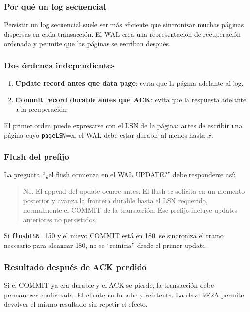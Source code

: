 \documentclass[variant=docente,cover=institutional,mode=screen]{ua-engineering-v6-article}
\begin{document}
\subsubsection*{Por qué un log secuencial}

Persistir un log secuencial suele ser más eficiente que sincronizar muchas páginas dispersas en cada transacción. El WAL crea una representación de recuperación ordenada y permite que las páginas se escriban después.

\subsubsection*{Dos órdenes independientes}

\begin{enumerate}
\item \textbf{Update record antes que data page}: evita que la página adelante al log.
\item \textbf{Commit record durable antes que ACK}: evita que la respuesta adelante a la recuperación.
\end{enumerate}

El primer orden puede expresarse con el LSN de la página: antes de escribir una página cuyo \texttt{pageLSN}=x, el WAL debe estar durable al menos hasta $x$.

\subsubsection*{Flush del prefijo}

La pregunta ``¿el flush comienza en el WAL UPDATE?'' debe responderse así:

\begin{quote}
No. El append del update ocurre antes. El flush se solicita en un momento posterior y avanza la frontera durable hasta el LSN requerido, normalmente el COMMIT de la transacción. Ese prefijo incluye updates anteriores no persistidos.
\end{quote}

Si \texttt{flushLSN}=150 y el nuevo COMMIT está en 180, se sincroniza el tramo necesario para alcanzar 180, no se ``reinicia'' desde el primer update.

\subsubsection*{Resultado después de ACK perdido}

Si el COMMIT ya era durable y el ACK se pierde, la transacción debe permanecer confirmada. El cliente no lo sabe y reintenta. La clave 9F2A permite devolver el mismo resultado sin repetir el efecto.
\end{document}
